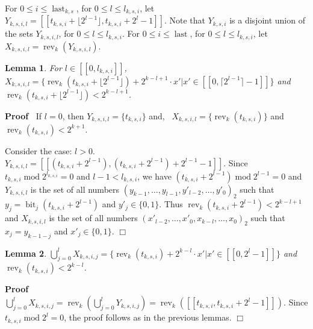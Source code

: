 \documentclass{article}
\newcommand{\tmop}[1]{\ensuremath{\operatorname{#1}}}
\newenvironment{proof}{\noindent\textbf{Proof\ }}{\hspace*{\fill}$\Box$\medskip}
\newtheorem{lemma}{Lemma}
\begin{document}
For $0 \leq i \leq \tmop{last}_{k, s}$, for $0 \leq l \leq l_{k, s, i}$, let
$Y_{k, s, i, l} = [[t_{k, s, i} + \lfloor 2^{l - 1} \rfloor, t_{k, s, i} + 2^l
- 1]]$. Note that $Y_{k, s, i}$ is a disjoint union of the sets $Y_{k, s, i,
l}$, for $0 \leq l \leq l_{k, s, i}$. For $0 \leq i \leq \tmop{last}$, for $0
\leq l \leq l_{k, s, i}$, let $X_{k, s, i, l} = \tmop{rev}_k (Y_{k, s, i,
l})$.

\begin{lemma}
  \label{X_il-Lemma} For $l \in [[0, l_{k, s, i}]]$, \ $X_{k, s, i, l}
  =\{\tmop{rev}_k (t_{k, s, i} + \lfloor 2^{l - 1} \rfloor) + 2^{k - l + 1}
  \cdot x' | x' \in [[0, \lceil 2^{l - 1} \rceil - 1]]\}$ and $\tmop{rev}_k
  (t_{k, s, i} + \lfloor 2^{l - 1} \rfloor) < 2^{k - l + 1}$.
\end{lemma}

\begin{proof}
  If $l = 0$, then $Y_{k, s, i, l} =\{t_{k, s, i}
  \}$ and, \ $X_{k, s, i, l} =\{\tmop{rev}_k (t_{k, s, i})\}$ and
  $\tmop{rev}_k (t_{k, s, i}) < 2^{k + 1}$.
  
  Consider the case: $l > 0$. $Y_{k, s, i, l} = [[(t_{k, s, i} + 2^{l - 1}), (t_{k,
  s, i} + 2^{l - 1}) + 2^{l - 1} - 1]]$. Since $t_{k, s, i} \tmop{mod}
  2^{l_{k, s, i}} = 0$ and $l - 1 < l_{k, s, i}$, we have $(t_{k, s, i} + 2^{l
  - 1}) \tmop{mod} 2^{l - 1} = 0$ and $Y_{k, s, i, l}$ is the set of all
  numbers $(y_{k - 1}, \ldots, y_{l - 1}, y'_{l - 2}, \ldots, y'_0)_2$ such
  that $y_j = \tmop{bit}_j (t_{k, s, i} + 2^{l - 1})$ and $y'_j \in \{0, 1\}$.
  Thus $\tmop{rev}_k (t_{k, s, i} + 2^{l - 1}) < 2^{k - l + 1}$ and $X_{k, s,
  i, l}$ is the set of all numbers $(x'_{l - 2}, \ldots, x'_0, x_{k - l},
  \ldots, x_0)_2$ such that $x_j = y_{k - 1 - j}$ and $x'_j \in \{0, 1\}$. 
\end{proof}

\begin{lemma}
  \label{union-X-Lemma}$\bigcup_{j = 0}^l X_{k, s, i, j} =\{\tmop{rev}_k
  (t_{k, s, i}) + 2^{k - l} \cdot x' | x' \in [[0, 2^l - 1]]\}$ and
  $\tmop{rev}_k (t_{k, s, i}) < 2^{k - l}$.
\end{lemma}

\begin{proof}
  $\bigcup_{j = 0}^l X_{k, s, i, j} =
  \tmop{rev}_k ( \bigcup_{j = 0}^l Y_{k, s, i, j}) = \tmop{rev}_k ([[t_{k, s,
  i}, t_{k, s, i} + 2^l - 1]])$. Since $t_{k, s, i} \tmop{mod} 2^l = 0$, the
  proof follows as in the previous lemmas. 
\end{proof}
\end{document}
